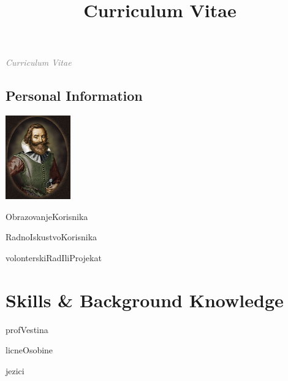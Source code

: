 \documentclass[11pt,a4paper,sans]{moderncv} %
\title{Curriculum Vitae}
\begin{document}
\textit{\Huge{\textcolor{gray}{Curriculum Vitae}}}

\hrulefill

\begin{multicols}{2}
  \section{Personal Information}
  \columnbreak
  \includegraphics[width=28mm, right]{pictures/picture.jpg}
\end{multicols}


ObrazovanjeKorisnika

RadnoIskustvoKorisnika

volonterskiRadIliProjekat
\

\section{Skills \& Background Knowledge}

profVestina

licneOsobine


jezici

\end{document}
